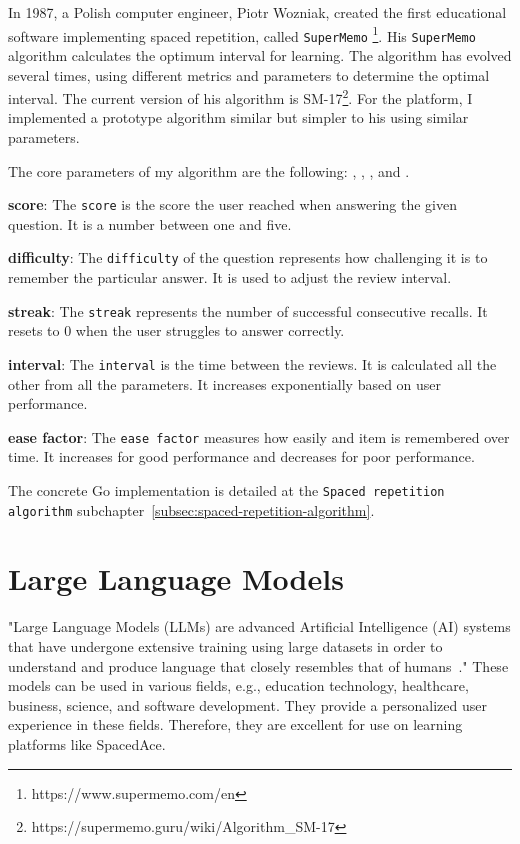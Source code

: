 In 1987, a Polish computer engineer, Piotr Wozniak, created the first educational software implementing spaced repetition, called \texttt{SuperMemo} \footnote{https://www.supermemo.com/en}. His \texttt{SuperMemo} algorithm calculates the optimum interval for learning. The algorithm has evolved several times, using different metrics and parameters to determine the optimal interval. The current version of his algorithm is SM-17\footnote{https://supermemo.guru/wiki/Algorithm_SM-17}. For the platform, I implemented a prototype algorithm similar but simpler to his using similar parameters.

The core parameters of my algorithm are the following: , , ,  and .

\textbf{score}: The \texttt{score} is the score the user reached when answering the given question. It is a number between one and five.

\textbf{difficulty}: The \texttt{difficulty} of the question represents how challenging it is to remember the particular answer. It is used to adjust the review interval.

\textbf{streak}: The \texttt{streak} represents the number of successful consecutive recalls. It resets to 0 when the user struggles to answer correctly.

\textbf{interval}: The \texttt{interval} is the time between the reviews. It is calculated all the other from all the parameters. It increases exponentially based on user performance.

\textbf{ease factor}: The \texttt{ease factor} measures how easily and item is remembered over time. It increases for good performance and decreases for poor performance.

The concrete Go implementation is detailed at the \texttt{Spaced repetition algorithm} subchapter~\ref{subsec:spaced-repetition-algorithm}.

\section{Large Language Models}

"Large Language Models (LLMs) are advanced Artificial Intelligence (AI) systems that have undergone extensive training using large datasets in order to understand and produce language that closely resembles that of humans~\cite{buscemi2023comparative}."  These models can be used in various fields, e.g., education technology, healthcare, business, science, and software development. They provide a personalized user experience in these fields. Therefore, they are excellent for use on learning platforms like SpacedAce.

